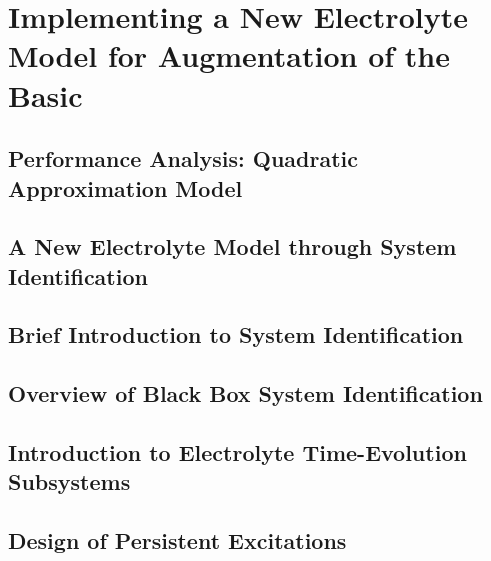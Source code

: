 
\graphicspath{{chapters/sys_id/figures/}}

\clearpage
\chapter{Implementing a New Electrolyte Model for Augmentation of the Basic }\label{ch:newelectrolytemodel}
\vspace*{-5mm}
\startcontents[chapters]



\section{Performance Analysis: Quadratic Approximation Model}\label{sec:symbolicregression}


\section{A New Electrolyte Model through System Identification}\label{sec:newelectrolytemodel}


\section{Brief Introduction to System Identification}\label{subsec:introsysid}



\vspace*{-5mm}
\section{Overview of Black Box System Identification}\label{sec:introblackboxsysid}


\section{Introduction to Electrolyte Time-Evolution Subsystems}\label{sec:introtoplant}


\section{Design of Persistent Excitations}\label{sec:persistentexcitation}


